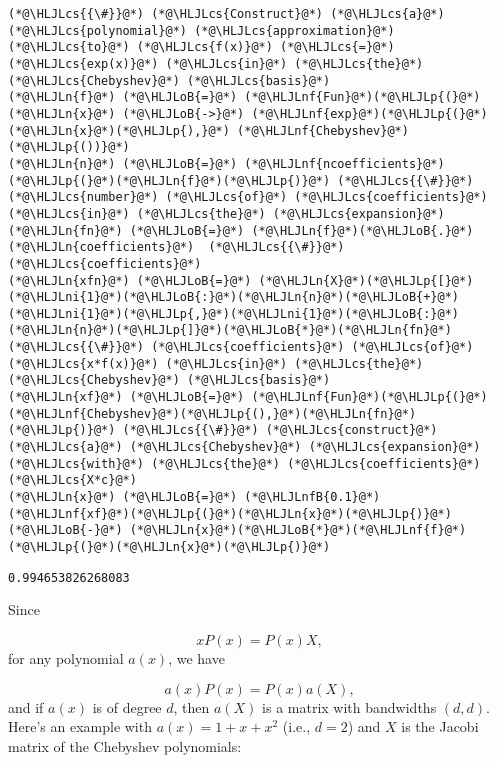\documentclass[12pt,landscape]{article}
\newcommand{\HLJLn}[1]{#1}
\newcommand{\HLJLnf}[1]{\textcolor[RGB]{66,102,213}{#1}}
\newcommand{\HLJLnfB}[1]{\textcolor[RGB]{59,151,46}{#1}}
\newcommand{\HLJLni}[1]{\textcolor[RGB]{59,151,46}{#1}}
\newcommand{\HLJLoB}[1]{\textcolor[RGB]{102,102,102}{\textbf{#1}}}
\newcommand{\HLJLp}[1]{#1}
\newcommand{\HLJLcs}[1]{\textcolor[RGB]{153,153,119}{\textit{#1}}}
\begin{document}
{\begin{lstlisting}
(*@\HLJLcs{{\#}}@*) (*@\HLJLcs{Construct}@*) (*@\HLJLcs{a}@*) (*@\HLJLcs{polynomial}@*) (*@\HLJLcs{approximation}@*) (*@\HLJLcs{to}@*) (*@\HLJLcs{f(x)}@*) (*@\HLJLcs{=}@*) (*@\HLJLcs{exp(x)}@*) (*@\HLJLcs{in}@*) (*@\HLJLcs{the}@*) (*@\HLJLcs{Chebyshev}@*) (*@\HLJLcs{basis}@*)
(*@\HLJLn{f}@*) (*@\HLJLoB{=}@*) (*@\HLJLnf{Fun}@*)(*@\HLJLp{(}@*)(*@\HLJLn{x}@*) (*@\HLJLoB{->}@*) (*@\HLJLnf{exp}@*)(*@\HLJLp{(}@*)(*@\HLJLn{x}@*)(*@\HLJLp{),}@*) (*@\HLJLnf{Chebyshev}@*)(*@\HLJLp{())}@*)
(*@\HLJLn{n}@*) (*@\HLJLoB{=}@*) (*@\HLJLnf{ncoefficients}@*)(*@\HLJLp{(}@*)(*@\HLJLn{f}@*)(*@\HLJLp{)}@*) (*@\HLJLcs{{\#}}@*) (*@\HLJLcs{number}@*) (*@\HLJLcs{of}@*) (*@\HLJLcs{coefficients}@*) (*@\HLJLcs{in}@*) (*@\HLJLcs{the}@*) (*@\HLJLcs{expansion}@*)
(*@\HLJLn{fn}@*) (*@\HLJLoB{=}@*) (*@\HLJLn{f}@*)(*@\HLJLoB{.}@*)(*@\HLJLn{coefficients}@*)  (*@\HLJLcs{{\#}}@*) (*@\HLJLcs{coefficients}@*)
(*@\HLJLn{xfn}@*) (*@\HLJLoB{=}@*) (*@\HLJLn{X}@*)(*@\HLJLp{[}@*)(*@\HLJLni{1}@*)(*@\HLJLoB{:}@*)(*@\HLJLn{n}@*)(*@\HLJLoB{+}@*)(*@\HLJLni{1}@*)(*@\HLJLp{,}@*)(*@\HLJLni{1}@*)(*@\HLJLoB{:}@*)(*@\HLJLn{n}@*)(*@\HLJLp{]}@*)(*@\HLJLoB{*}@*)(*@\HLJLn{fn}@*)  (*@\HLJLcs{{\#}}@*) (*@\HLJLcs{coefficients}@*) (*@\HLJLcs{of}@*) (*@\HLJLcs{x*f(x)}@*) (*@\HLJLcs{in}@*) (*@\HLJLcs{the}@*) (*@\HLJLcs{Chebyshev}@*) (*@\HLJLcs{basis}@*)
(*@\HLJLn{xf}@*) (*@\HLJLoB{=}@*) (*@\HLJLnf{Fun}@*)(*@\HLJLp{(}@*)(*@\HLJLnf{Chebyshev}@*)(*@\HLJLp{(),}@*)(*@\HLJLn{fn}@*)(*@\HLJLp{)}@*) (*@\HLJLcs{{\#}}@*) (*@\HLJLcs{construct}@*) (*@\HLJLcs{a}@*) (*@\HLJLcs{Chebyshev}@*) (*@\HLJLcs{expansion}@*) (*@\HLJLcs{with}@*) (*@\HLJLcs{the}@*) (*@\HLJLcs{coefficients}@*) (*@\HLJLcs{X*c}@*)
(*@\HLJLn{x}@*) (*@\HLJLoB{=}@*) (*@\HLJLnfB{0.1}@*)
(*@\HLJLnf{xf}@*)(*@\HLJLp{(}@*)(*@\HLJLn{x}@*)(*@\HLJLp{)}@*) (*@\HLJLoB{-}@*) (*@\HLJLn{x}@*)(*@\HLJLoB{*}@*)(*@\HLJLnf{f}@*)(*@\HLJLp{(}@*)(*@\HLJLn{x}@*)(*@\HLJLp{)}@*)
\end{lstlisting}

\begin{lstlisting}
0.994653826268083
\end{lstlisting}


Since 

\[
xP(x) = P(x) X,
\]
for any polynomial $a(x)$, we have

\[
a(x) P(x) = P(x) a(X),
\]
and if $a(x)$ is of degree $d$, then $a(X)$ is a matrix with bandwidths $(d,d)$.  Here's an example with $a(x) = 1 + x + x^2$ (i.e., $d = 2$) and $X$ is the Jacobi matrix of the Chebyshev polynomials:


}
\end{document}
